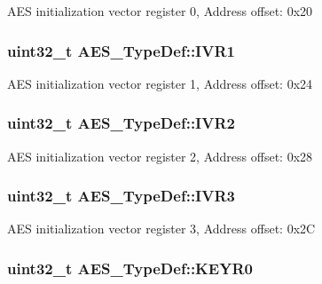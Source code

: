 A\-E\-S initialization vector register 0, Address offset\-: 0x20 \hypertarget{struct_a_e_s___type_def_a6fb98e2e9d464161d805b5785b764ddf}{
\subsubsection[{I\-V\-R1}]{ uint32\-\_\-t A\-E\-S\-\_\-\-Type\-Def\-::\-I\-V\-R1}}\label{struct_a_e_s___type_def_a6fb98e2e9d464161d805b5785b764ddf}
A\-E\-S initialization vector register 1, Address offset\-: 0x24 \hypertarget{struct_a_e_s___type_def_ab7dcb8897ad132d7c2a334eb5059c955}{
\subsubsection[{I\-V\-R2}]{ uint32\-\_\-t A\-E\-S\-\_\-\-Type\-Def\-::\-I\-V\-R2}}\label{struct_a_e_s___type_def_ab7dcb8897ad132d7c2a334eb5059c955}
A\-E\-S initialization vector register 2, Address offset\-: 0x28 \hypertarget{struct_a_e_s___type_def_a0f7547617d859202a18a12933e7dce8e}{
\subsubsection[{I\-V\-R3}]{ uint32\-\_\-t A\-E\-S\-\_\-\-Type\-Def\-::\-I\-V\-R3}}\label{struct_a_e_s___type_def_a0f7547617d859202a18a12933e7dce8e}
A\-E\-S initialization vector register 3, Address offset\-: 0x2\-C \hypertarget{struct_a_e_s___type_def_a4fcb96eb7820d80f3f9027d3d19e0e48}{
\subsubsection[{K\-E\-Y\-R0}]{ uint32\-\_\-t A\-E\-S\-\_\-\-Type\-Def\-::\-K\-E\-Y\-R0}}\label{struct_a_e_s___type_def_a4fcb96eb7820d80f3f9027d3d19e0e48}
